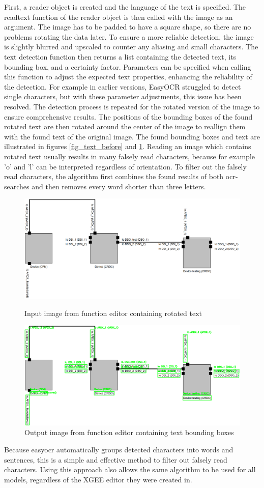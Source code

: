 First, a reader object is created and the language of the text is specified. The readtext function of the reader object is then called with the image as an argument. The image has to be padded to have a square shape, so there are no problems rotating the data later. To ensure a more reliable detection, the image is slightly blurred and upscaled to counter any aliasing and small characters. The text detection function then returns a list containing the detected text, its bounding box, and a certainty factor. Parameters can be specified when calling this function to adjust the expected text properties, enhancing the reliability of the detection. For example in earlier versions, EasyOCR struggled to detect single characters, but with these parameter adjustments, this issue has been resolved. The detection process is repeated for the rotated version of the image to ensure comprehensive results. The positions of the bounding boxes of the found rotated text are then rotated around the center of the image to reallign them with the found text of the original image. The found bounding boxes and text are illustrated in figures \ref{fig_text_before} and \ref{fig_text_after}. Reading an image which contains rotated text usually results in many falsely read characters, because for example 'o' and 'l' can be interpreted regardless of orientation. To filter out the falsely read characters, the algorithm first combines the found results of both ocr-searches and then removes every word shorter than three letters.
\begin{figure}[htb]
    \centering
    \includegraphics[width=0.8\linewidth]{Pictures/text_before.png}
    \caption{Input image from function editor containing rotated text}
    \label{fig_text_before}

    \centering
    \includegraphics[width=0.8\linewidth]{Pictures/text_after.png}
    \caption{Output image from function editor containing text bounding boxes}
    \label{fig_text_after}
\end{figure}
Because easyocr automatically groups detected characters into words and sentences, this is a simple and effective method to filter out falsely read characters. Using this approach also allows the same algorithm to be used for all models, regardless of the XGEE editor they were created in.
